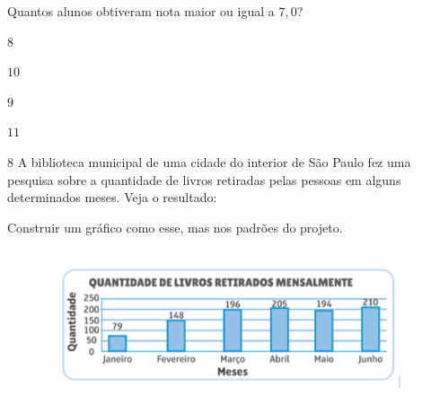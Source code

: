 Quantos alunos obtiveram nota maior ou igual a $7,0$?

\begin{escolha}
\item $8$
\item $10$
\item $9$
\item $11$
\end{escolha}



\num{8}  A biblioteca municipal de uma cidade do interior de São Paulo fez uma
pesquisa sobre a quantidade de livros retiradas pelas pessoas em alguns
determinados meses. Veja o resultado:

Construir um gráfico como esse, mas nos padrões do projeto.

\begin{figure}
\centering  \includegraphics[width=5in,height=1.71875in]{./imgSAEB_6_MAT/media/image117.png}
\end{figure}

